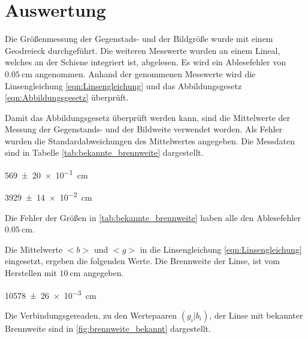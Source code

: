\section{Auswertung}

Die Größenmessung der Gegenstads- und der Bildgröße wurde mit einem Geodreieck durchgeführt.
Die weiteren Messwerte wurden an einem Lineal, welches an der Schiene integriert
ist, abgelesen. Es wird ein Ablesefehler von $\SI{0,05}{\centi\meter}$ angenommen.
Anhand der genommenen Messwerte wird die Linsengleichung \eqref{eqn:Linsengleichung} und das
Abbildungsgesetz \eqref{eqn:Abbildungsgesetz} überprüft.

Damit das Abbildungsgesetz überprüft werden kann, sind die Mittelwerte der Messung
der Gegenstands- und der Bildweite verwendet worden. Als Fehler wurden die
Standardabweichungen des Mittelwertes angegeben.
Die Messdaten sind in Tabelle \ref{tab:bekannte_brennweite} dargestellt.

\begin{description}
  \centering
  \item[$\frac{B}{G}=$]\SI{569(20)e-1}{\centi\meter}
  \item[$\frac{<b>}{<g>}=$]\SI{3929(14)e-2}{\centi\meter}
\end{description}



Die Fehler der Größen in \ref{tab:bekannte_brennweite} haben alle den Ablesefehler
$\SI{0,05}{\centi\meter}$.

Die Mittelwerte $<b>$ und $<g>$ in die Linsengleichung \eqref{eqn:Linsengleichung} eingesetzt,
ergeben die folgenden
Werte. Die Brennweite der Linse, ist vom Herstellen mit $\SI{10}{\centi\meter}$
angegeben.

\begin{description}
  \centering
  \item[$<f_1>\ua{gemessen}=$]\SI{10578(26)e-3}{\centi\meter}
\end{description}

Die Verbindungsgereaden, zu den Wertepaaren $(g_i|b_i)$, der Linse mit bekannter
Brennweite sind in \ref{fig:brennweite_bekannt}
dargestellt.

